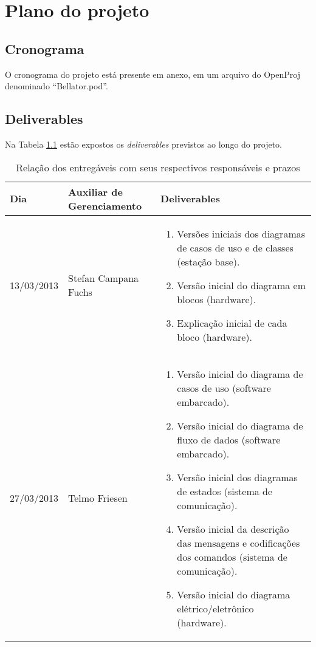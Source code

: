 \chapter{Plano do projeto}
\section{Cronograma}
O cronograma do projeto está presente em anexo, em um arquivo do OpenProj denominado ``Bellator.pod''.

\section{Deliverables}

Na Tabela \ref{tab:deliverables1} estão expostos os \textit{deliverables} previstos ao longo do projeto.

\begin{table}[h]
  \centering
  \caption{Relação dos entregáveis com seus respectivos responsáveis e prazos}
  \begin{tabular}{|p{3cm}|p{4cm}|p{7cm}|}
    \toprule
    \textbf{Dia}   & \textbf{Auxiliar de Gerenciamento} & \textbf{Deliverables} \\
    \hline
    13/03/2013 & Stefan Campana Fuchs & 
    \begin{enumerate}[topsep=0pt, partopsep=0pt, itemsep=0pt]
      \item Versões iniciais dos diagramas de casos de uso e de classes (estação base).
      \item Versão inicial do diagrama em blocos (hardware).
      \item Explicação inicial de cada bloco (hardware).
    \end{enumerate}\\
    \hline
    27/03/2013 & Telmo Friesen & 
    \begin{enumerate}[topsep=0pt, partopsep=0pt, itemsep=0pt]
      \item Versão inicial do diagrama de casos de uso (software embarcado).
      \item Versão inicial do diagrama de fluxo de dados (software embarcado).
      \item Versão inicial dos diagramas de estados (sistema de comunicação).
      \item Versão inicial da descrição das mensagens e codificações dos comandos (sistema de comunicação).
      \item Versão inicial do diagrama elétrico/eletrônico (hardware).
    \end{enumerate}\\
  \end{tabular}%
  \label{tab:deliverables1}%
\end{table}%



